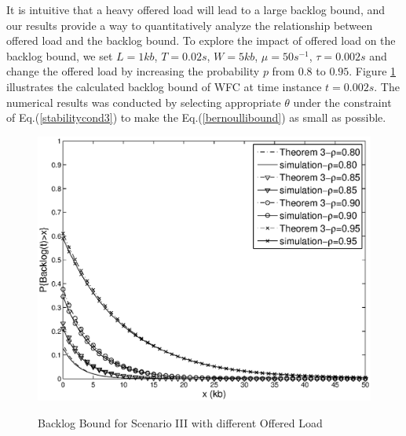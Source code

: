 \documentclass[12pt]{article}
\begin{document}
It is intuitive that a heavy offered load will lead to a large backlog bound, and our results  provide a way to quantitatively analyze the relationship between offered load and the backlog bound. To explore the impact of offered load on the backlog bound, we set $L=1kb$, $T=0.02s$, $W=5kb$, $\mu=50s^{-1}$, $\tau=0.002s$ and change the offered load by increasing the probability $p$ from $0.8$ to $0.95$. Figure \ref{result2} illustrates the calculated backlog bound of WFC at time instance $t=0.002s$. The numerical results was conducted by selecting appropriate $\theta$ under the constraint of Eq.(\ref{stabilitycond3}) to make the Eq.(\ref{bernoullibound}) as small as possible.
\begin{figure}
  \centering
  \includegraphics[scale=0.45]{figures/backlogrho.eps}\\
  \caption{Backlog Bound for Scenario III with different Offered Load}\label{result2}
\end{figure}
\end{document}
